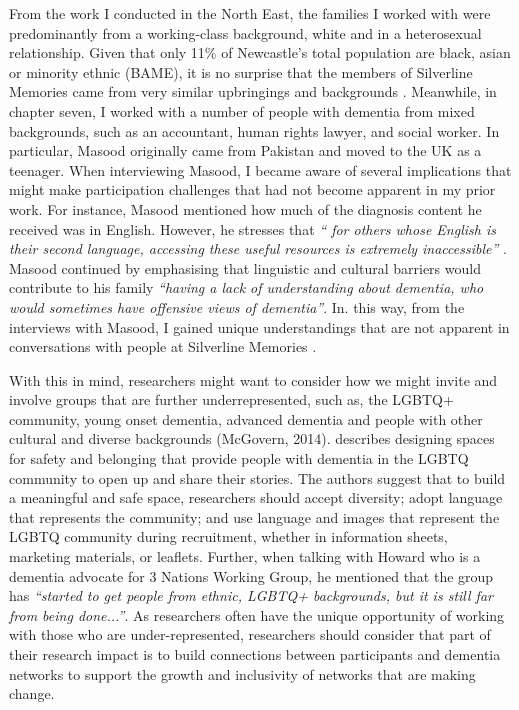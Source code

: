 From the work I conducted in the North East, the families I worked with were predominantly from a working-class background, white and in a heterosexual relationship. Given that only 11\% of Newcastle's total population are black, asian or minority ethnic (BAME), it is no surprise that the members of Silverline Memories came from very similar upbringings and backgrounds \citep{cityCouncil_2021}. Meanwhile, in chapter seven, I worked with a number of people with dementia from mixed backgrounds, such as an accountant, human rights lawyer, and social worker. In particular, Masood originally came from Pakistan and moved to the UK as a teenager. When interviewing Masood, I became aware of several implications that might make participation challenges that had not become apparent in my prior work. For instance, Masood mentioned how much of the diagnosis content he received was in English. However, he stresses that \textit{`` for others whose English is their second language, accessing these useful resources is extremely inaccessible''} \citep{cooper2018relationship}. Masood continued by emphasising that linguistic and cultural barriers would contribute to his family \textit{``having a lack of understanding about dementia, who would sometimes have offensive views of dementia''}. In. this way, from the interviews with Masood, I gained unique understandings that are not apparent in conversations with people at Silverline Memories . 

With this in mind, researchers might want to consider how we might invite and involve groups that are further underrepresented, such as, the LGBTQ+ community, young onset dementia, advanced dementia and people with other cultural and diverse backgrounds \citep{foley_struggle_2019, bryden_before_2015} (McGovern, 2014). \cite{mcgovern2014forgotten} describes designing spaces for safety and belonging that provide people with dementia in the LGBTQ community to open up and share their stories. The authors suggest that to build a meaningful and safe space, researchers should accept diversity; adopt language that represents the community; and use language and images that represent the LGBTQ community during recruitment, whether in information sheets, marketing materials, or leaflets. Further, when talking with Howard who is a dementia advocate for 3 Nations Working Group, he mentioned that the group has \textit{``started to get people from ethnic, LGBTQ+ backgrounds, but it is still far from being done...''}. As researchers often have the unique opportunity of working with those who are under-represented, researchers should consider that part of their research impact is to build connections between participants and dementia networks to support the growth and inclusivity of networks that are making change. 

